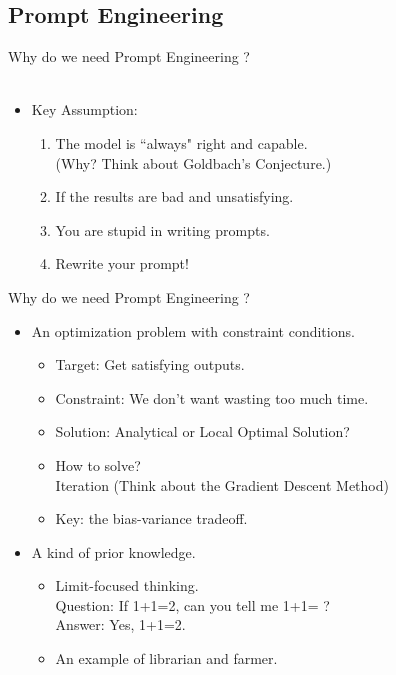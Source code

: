 \documentclass[UTF8, 16pt]{beamer}
\begin{document}
\begin{CJK*}{UTF8}{gbsn}
\section{Prompt Engineering}
\begin{frame}{Why do we need Prompt Engineering ?}
	\\ \ \\
	\begin{itemize}
		\item Key Assumption:
			\begin{enumerate}
				\item The model is \alert{``always"} right and capable. 
					\\ 
					(Why? Think about Goldbach's Conjecture.)
				\item If the results are bad and unsatisfying.
				\item You are stupid in writing prompts.
				\item Rewrite your prompt!
			\end{enumerate}
	\end{itemize}
\end{frame}
\begin{frame}{Why do we need Prompt Engineering ?}
	\begin{itemize}
		\item An \alert{optimization} problem with \alert{constraint} conditions.
			\begin{itemize}
				\item \alert{Target}: Get satisfying outputs.
				\item \alert{Constraint}: We don't want wasting too much time.
				\item Solution: Analytical or \alert{Local Optimal Solution}?
				\item How to solve?
					\\ 
					\alert{Iteration} (Think about the Gradient Descent Method)
				\item Key: the \alert{bias-variance tradeoff}.
			\end{itemize}
		\item A kind of \alert{prior knowledge}.
			\begin{itemize}
				\item \alert{Limit-focused thinking}.
					\\
					Question: If 1+1=2, can you tell me 1+1= ?
					\\
					Answer: Yes, 1+1=2.
				\item An \alert{example} of librarian and farmer.

\end{itemize}
\end{itemize}
\end{frame}
\end{CJK*}
\end{document}
